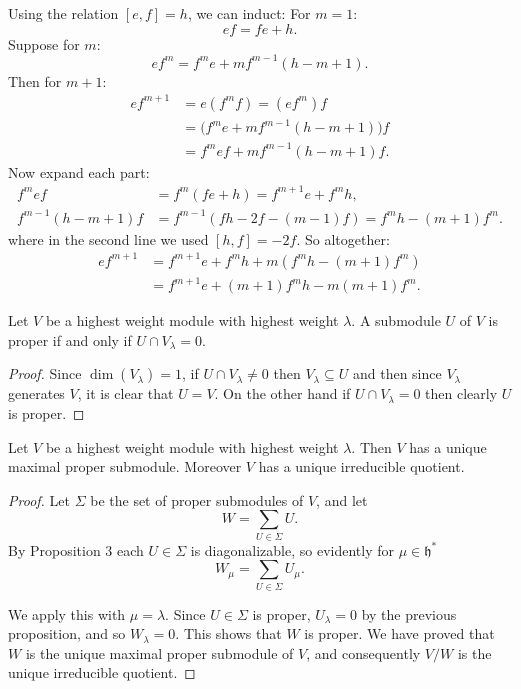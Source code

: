 \documentclass[12pt]{article}
\begin{document}
\begin{remark}
    Using the relation $[e,f] = h$, we can induct:
    For $m=1$:
    \[
        e f = f e + h.
    \]
    Suppose for $m$:
    \[
        e f^m = f^m e + m f^{m-1}(h - m + 1).
    \]
    Then for $m+1$:
    \begin{align*}
        e f^{m+1} & = e (f^m f) = (e f^m) f                    \\
                  & = \big(f^m e + m f^{m-1}(h - m + 1)\big) f \\
                  & = f^m e f + m f^{m-1}(h - m + 1) f.
    \end{align*}
    Now expand each part:
    \begin{align*}
        f^m e f              & = f^m (f e + h) = f^{m+1} e + f^m h,               \\
        f^{m-1}(h - m + 1) f & = f^{m-1} (f h - 2f - (m-1)f) = f^m h - (m+1) f^m.
    \end{align*}
    where in the second line we used $[h,f] = -2f$. So altogether:
    \begin{align*}
        e f^{m+1} & = f^{m+1} e + f^m h + m(f^m h - (m+1) f^m) \\
                  & = f^{m+1} e + (m+1) f^m h - m(m+1) f^m.
    \end{align*}
\end{remark}


\begin{proposition}
    Let $V$ be a highest weight module with highest weight $\lambda$. A submodule $U$ of $V$ is proper if and only if $U \cap V_\lambda = 0$.
\end{proposition}

\begin{proof}
    Since $\dim(V_\lambda) = 1$, if $U \cap V_\lambda \neq 0$ then $V_\lambda \subseteq U$ and then since $V_\lambda$ generates $V$, it is clear that $U = V$. On the other hand if $U \cap V_\lambda = 0$ then clearly $U$ is proper.
\end{proof}

\begin{proposition}
    Let $V$ be a highest weight module with highest weight $\lambda$. Then $V$ has a unique maximal proper submodule. Moreover $V$ has a unique irreducible quotient.
\end{proposition}

\begin{proof}
    Let $\Sigma$ be the set of proper submodules of $V$, and let
    \[
        W = \sum_{U \in \Sigma} U.
    \]
    By Proposition 3 each $U \in \Sigma$ is diagonalizable, so evidently for $\mu \in \mathfrak{h}^*$
    \[
        W_\mu = \sum_{U \in \Sigma} U_\mu.
    \]

    We apply this with $\mu = \lambda$. Since $U \in \Sigma$ is proper, $U_\lambda = 0$ by the previous proposition, and so $W_\lambda = 0$. This shows that $W$ is proper. We have proved that $W$ is the unique maximal proper submodule of $V$, and consequently $V/W$ is the unique irreducible quotient.
\end{proof}
\end{document}
